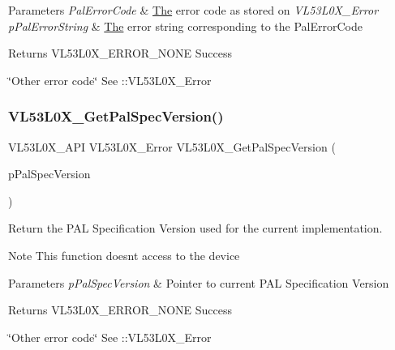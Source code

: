 \begin{DoxyParams}{Parameters}
{\em Pal\+Error\+Code} & \hyperlink{structThe}{The} error code as stored on {\itshape V\+L53\+L0\+X\+\_\+\+Error} \\
\hline
{\em p\+Pal\+Error\+String} & \hyperlink{structThe}{The} error string corresponding to the Pal\+Error\+Code \\
\hline
\end{DoxyParams}
\begin{DoxyReturn}{Returns}
V\+L53\+L0\+X\+\_\+\+E\+R\+R\+O\+R\+\_\+\+N\+O\+NE Success 

\char`\"{}\+Other error code\char`\"{} See \+::\+V\+L53\+L0\+X\+\_\+\+Error 
\end{DoxyReturn}
\mbox{\label{group__VL53L0X__general__group_gad66c4309fbbf14d68692c18982158fba}} 
\subsubsection{\texorpdfstring{V\+L53\+L0\+X\+\_\+\+Get\+Pal\+Spec\+Version()}{VL53L0X\_GetPalSpecVersion()}}
{\footnotesize\ttfamily V\+L53\+L0\+X\+\_\+\+A\+PI V\+L53\+L0\+X\+\_\+\+Error V\+L53\+L0\+X\+\_\+\+Get\+Pal\+Spec\+Version (\begin{DoxyParamCaption}\item[{\hyperlink{structVL53L0X__Version__t}{V\+L53\+L0\+X\+\_\+\+Version\+\_\+t} $\ast$}]{p\+Pal\+Spec\+Version }\end{DoxyParamCaption})}



Return the P\+AL Specification Version used for the current implementation. 

\begin{DoxyNote}{Note}
This function doesn\textquotesingle{}t access to the device
\end{DoxyNote}

\begin{DoxyParams}{Parameters}
{\em p\+Pal\+Spec\+Version} & Pointer to current P\+AL Specification Version \\
\hline
\end{DoxyParams}
\begin{DoxyReturn}{Returns}
V\+L53\+L0\+X\+\_\+\+E\+R\+R\+O\+R\+\_\+\+N\+O\+NE Success 

\char`\"{}\+Other error code\char`\"{} See \+::\+V\+L53\+L0\+X\+\_\+\+Error 
\end{DoxyReturn}
\mbox{\label{group__VL53L0X__general__group_gac4b91d3adc134655064fcc2c4a9adf24}} 
